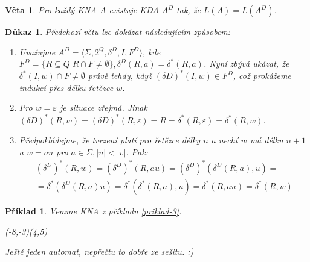 \documentclass[10pt, a4paper, titlepage]{article}
\theoremstyle{note}
\newtheorem{veta}{\textbf{Věta}}
\newtheorem{dukaz}{\textbf{Důkaz}}
\newtheorem{priklad}{\textbf{Příklad}}
\begin{document}
\begin{veta}
Pro každý KNA $A$ existuje KDA $A^{D}$ tak, že $L(A) = L(A^{D})$.
\end{veta}
\begin{dukaz}
Předchozí větu lze dokázat následujícím způsobem:

\begin{enumerate}
\item
Uvažujme $A^{D} = \langle \Sigma, 2^{Q}, \delta^{D}, I, F^{D} \rangle$, kde $F^{D} = \lbrace R  \subseteq Q | R \cap F \neq \emptyset \rbrace, \delta^{D}(R,a) = \delta^{*}(R,a)$.
Nyní zbývá ukázat, že $\delta^{*}(I,w) \cap F \neq \emptyset$ právě tehdy, když $(\delta{D})^{*}(I,w) \in F^{D}$, což prokážeme indukcí přes délku řetězce $w$.

\item
Pro $w = \varepsilon$ je situace zřejmá. Jinak $(\delta{D})^{*} (R,w) = (\delta{D})^{*} (R, \varepsilon) = R = \delta^{*}(R, \varepsilon) = \delta^{*}(R,w)$.

\item
Předpokládejme, že tvrzení platí pro řetězce délky $n$ a nechť $w$ má délku $n+1$ a $w=au$ pro $a \in \Sigma, |u| < |v|$. Pak:
\begin{gather*}
(\delta^{D})^{*} (R,w) = (\delta^{D})^{*} (R, au) = (\delta^{D})^{*}(\delta^{D}(R,a),u) = \\
= \delta^{*}(\delta^{D}(R,a)u) = \delta^{*}(\delta^{*}(R,a),u) = \delta^{*}(R, au) = \delta^{*}(R,w)
\end{gather*}
\end{enumerate}
\end{dukaz}

\begin{priklad}
Vemme KNA z příkladu \ref{priklad-3}.

\begin{VCPicture}{(-8,-3)(4,5)}


\end{VCPicture}

Ještě jeden automat, nepřečtu to dobře ze sešitu. :)

\end{priklad}
\end{document}

